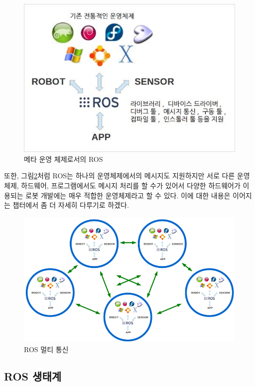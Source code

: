 \begin{figure}[h]
\centering\includegraphics[width=0.9\columnwidth]{pictures/chapter1/ros_is_not_os.jpg}
\caption{메타 운영 체제로서의 ROS}
\label{fig:metaos}
\end{figure}

또한, 그림\ref{fig:rosmulti}처럼 ROS는 하나의 운영체제에서의 메시지도 지원하지만 서로 다른 운영체제, 하드웨어, 프로그램에서도 메시지 처리를 할 수가 있어서 다양한 하드웨어가 이용되는 로봇 개발에는 매우 적합한 운영체제라고 할 수 있다.
이에 대한 내용은 이어지는 챕터에서 좀 더 자세히 다루기로 하겠다.  

\begin{figure}[h]
\centering\includegraphics[width=0.9\columnwidth]{pictures/chapter1/rosmulti.png}
\caption{ROS 멀티 통신}
\label{fig:rosmulti}
\end{figure}

\subsection{ROS 생태계}

